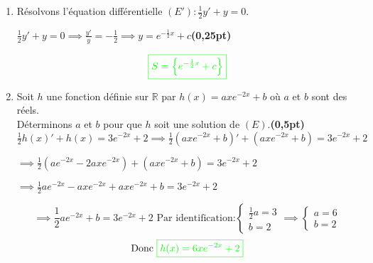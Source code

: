 \documentclass[12pt]{article}
\begin{document}
\renewcommand{\labelenumi}{\theenumi)}
\begin{enumerate}[label=\arabic*)]
    \item Résolvons l'équation différentielle \( (E'):\frac{1}{2}y'+y=0 \).
    
		    \( \frac{1}{2}y'+y=0 \implies \frac{y'}{y}=-\frac{1}{2} \implies y=e^{-\frac{1}{2}x}+c\)\hfill \textbf{(0,25pt)}
    
    	   			\[\textcolor{green}{\boxed{S= \left\lbrace e^{-\frac{1}{2}x}+c \right\rbrace  }}\]
    	   			
    \item Soit $h$ une fonction définie sur $\mathbb{R}$ par $h(x)=axe^{-2x}+b$ où $a$ et $b$ sont  des réels.\\
        Déterminons $a$ et $b$ pour que $h$ soit une solution de $(E).$\hfill \textbf{(0,5pt)}
        \( \frac{1}{2}h(x)'+h(x)=3e^{-2x}+2 \implies \frac{1}{2}(axe^{-2x}+b)'+(axe^{-2x}+b)=3e^{-2x}+2 \)
        
        \( \implies \frac{1}{2}(ae^{-2x}-2axe^{-2x})+(axe^{-2x}+b)=3e^{-2x}+2 \)
        
        \( \implies \frac{1}{2}ae^{-2x}-axe^{-2x}+axe^{-2x}+b=3e^{-2x}+2 \)
        
        \[ 
        \implies \frac{1}{2}ae^{-2x}+b=3e^{-2x}+2\text{ Par identification:}
        \begin{cases}
        \frac{1}{2}a=3\\
        b=2
        \end{cases}\implies
        \begin{cases}
         a=6\\
         b=2
        \end{cases}
        \]
\[\text{Donc } \textcolor{green}{\boxed{h(x)=6xe^{-2x}+2}} \]
\end{enumerate}
\end{document}
